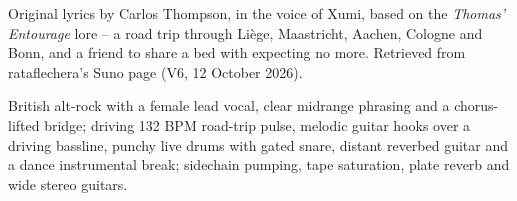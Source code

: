 
\label{sec:my-kind-of-friend}
\begin{notes}
Original lyrics by Carlos Thompson, in the voice of Xumi, based on the \emph{Thomas' Entourage} lore -- a road trip through Liège, Maastricht, Aachen, Cologne and Bonn, and a friend to share a bed with expecting no more. Retrieved from rataflechera's Suno page (V6, 12 October 2026).
\end{notes}
\begin{style}
British alt-rock with a female lead vocal, clear midrange phrasing and a chorus-lifted bridge; driving 132 BPM road-trip pulse, melodic guitar hooks over a driving bassline, punchy live drums with gated snare, distant reverbed guitar and a dance instrumental break; sidechain pumping, tape saturation, plate reverb and wide stereo guitars.
\end{style}
